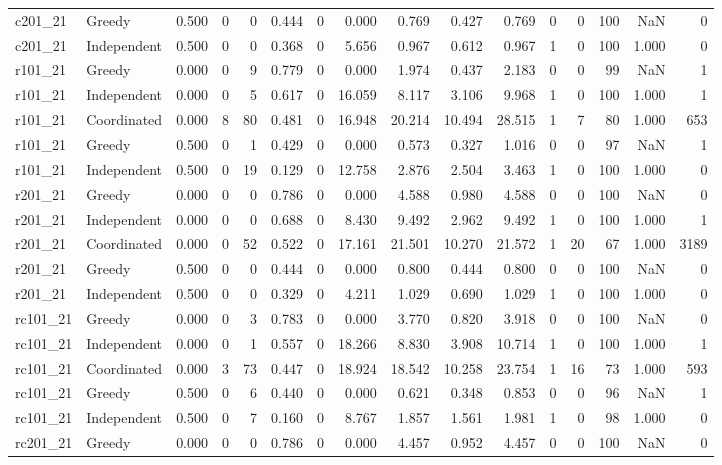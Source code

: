 \begin{tabular}{llrrrrrrrrrrrrrr}
c201\_21 & Greedy & 0.500 & 0 & 0 & 0.444 & 0 & 0.000 & 0.769 & 0.427 & 0.769 & 0 & 0 & 100 & NaN & 0 \\
c201\_21 & Independent & 0.500 & 0 & 0 & 0.368 & 0 & 5.656 & 0.967 & 0.612 & 0.967 & 1 & 0 & 100 & 1.000 & 0 \\
r101\_21 & Greedy & 0.000 & 0 & 9 & 0.779 & 0 & 0.000 & 1.974 & 0.437 & 2.183 & 0 & 0 & 99 & NaN & 1 \\
r101\_21 & Independent & 0.000 & 0 & 5 & 0.617 & 0 & 16.059 & 8.117 & 3.106 & 9.968 & 1 & 0 & 100 & 1.000 & 1 \\
r101\_21 & Coordinated & 0.000 & 8 & 80 & 0.481 & 0 & 16.948 & 20.214 & 10.494 & 28.515 & 1 & 7 & 80 & 1.000 & 653 \\
r101\_21 & Greedy & 0.500 & 0 & 1 & 0.429 & 0 & 0.000 & 0.573 & 0.327 & 1.016 & 0 & 0 & 97 & NaN & 1 \\
r101\_21 & Independent & 0.500 & 0 & 19 & 0.129 & 0 & 12.758 & 2.876 & 2.504 & 3.463 & 1 & 0 & 100 & 1.000 & 0 \\
r201\_21 & Greedy & 0.000 & 0 & 0 & 0.786 & 0 & 0.000 & 4.588 & 0.980 & 4.588 & 0 & 0 & 100 & NaN & 0 \\
r201\_21 & Independent & 0.000 & 0 & 0 & 0.688 & 0 & 8.430 & 9.492 & 2.962 & 9.492 & 1 & 0 & 100 & 1.000 & 1 \\
r201\_21 & Coordinated & 0.000 & 0 & 52 & 0.522 & 0 & 17.161 & 21.501 & 10.270 & 21.572 & 1 & 20 & 67 & 1.000 & 3189 \\
r201\_21 & Greedy & 0.500 & 0 & 0 & 0.444 & 0 & 0.000 & 0.800 & 0.444 & 0.800 & 0 & 0 & 100 & NaN & 0 \\
r201\_21 & Independent & 0.500 & 0 & 0 & 0.329 & 0 & 4.211 & 1.029 & 0.690 & 1.029 & 1 & 0 & 100 & 1.000 & 0 \\
rc101\_21 & Greedy & 0.000 & 0 & 3 & 0.783 & 0 & 0.000 & 3.770 & 0.820 & 3.918 & 0 & 0 & 100 & NaN & 0 \\
rc101\_21 & Independent & 0.000 & 0 & 1 & 0.557 & 0 & 18.266 & 8.830 & 3.908 & 10.714 & 1 & 0 & 100 & 1.000 & 1 \\
rc101\_21 & Coordinated & 0.000 & 3 & 73 & 0.447 & 0 & 18.924 & 18.542 & 10.258 & 23.754 & 1 & 16 & 73 & 1.000 & 593 \\
rc101\_21 & Greedy & 0.500 & 0 & 6 & 0.440 & 0 & 0.000 & 0.621 & 0.348 & 0.853 & 0 & 0 & 96 & NaN & 1 \\
rc101\_21 & Independent & 0.500 & 0 & 7 & 0.160 & 0 & 8.767 & 1.857 & 1.561 & 1.981 & 1 & 0 & 98 & 1.000 & 0 \\
rc201\_21 & Greedy & 0.000 & 0 & 0 & 0.786 & 0 & 0.000 & 4.457 & 0.952 & 4.457 & 0 & 0 & 100 & NaN & 0 \\

\end{tabular}

